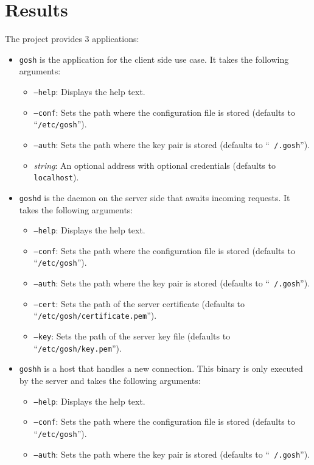 \documentclass[10pt,a4paper,titlepage,twoside,english,final]{zhawreprt}
\begin{document}
\chapter{Results}\label{chp:Results}
The project provides 3 applications:
\begin{itemize}
\item \texttt{gosh} is the application for the client side use case.
It takes the following arguments:
\begin{itemize}
\item \texttt{--help}: Displays the help text.
\item \texttt{--conf}: Sets the path where the configuration file is stored (defaults to ``\texttt{/etc/gosh}'').
\item \texttt{--auth}: Sets the path where the key pair is stored (defaults to ``\texttt{~/.gosh}'').
\item \textit{string}: An optional address with optional credentials (defaults to \texttt{localhost}).
\end{itemize}
\item \texttt{goshd} is the \gls{daemon} on the server side that awaits incoming requests.
It takes the following arguments:
\begin{itemize}
\item \texttt{--help}: Displays the help text.
\item \texttt{--conf}: Sets the path where the configuration file is stored (defaults to ``\texttt{/etc/gosh}'').
\item \texttt{--auth}: Sets the path where the key pair is stored (defaults to ``\texttt{~/.gosh}'').
\item \texttt{--cert}: Sets the path of the server certificate (defaults to ``\texttt{/etc/gosh/certifi\linebreak{}cate.pem}'').
\item \texttt{--key}: Sets the path of the server key file (defaults to ``\texttt{/etc/gosh/key.pem}'').
\end{itemize}
\item \texttt{goshh} is a host that handles a new connection.
This binary is only executed by the server and takes the following arguments:
\begin{itemize}
\item \texttt{--help}: Displays the help text.
\item \texttt{--conf}: Sets the path where the configuration file is stored (defaults to ``\texttt{/etc/gosh}'').
\item \texttt{--auth}: Sets the path where the key pair is stored (defaults to ``\texttt{~/.gosh}'').

\end{itemize}
\end{itemize}
\end{document}
